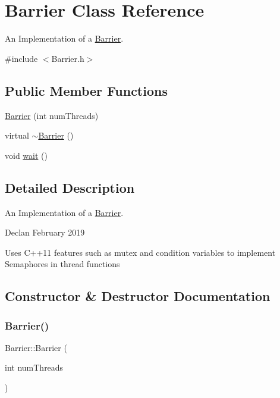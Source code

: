 \hypertarget{class_barrier}{}\section{Barrier Class Reference}
\label{class_barrier}


An Implementation of a \hyperlink{class_barrier}{Barrier}.  




{\ttfamily \#include $<$Barrier.\+h$>$}

\subsection*{Public Member Functions}
\begin{DoxyCompactItemize}
\item 
\hyperlink{class_barrier_a7290fb8952d0f7779b8d6a7a34bbd407}{Barrier} (int num\+Threads)
\item 
virtual \hyperlink{class_barrier_a401f40e73302009b305904ffc7825304}{$\sim$\+Barrier} ()
\item 
void \hyperlink{class_barrier_a83a9d2e85e98b3d2081538bf0da29b60}{wait} ()
\end{DoxyCompactItemize}


\subsection{Detailed Description}
An Implementation of a \hyperlink{class_barrier}{Barrier}. 

Declan February 2019

Uses C++11 features such as mutex and condition variables to implement Semaphores in thread functions 

\subsection{Constructor \& Destructor Documentation}
\mbox{\label{class_barrier_a7290fb8952d0f7779b8d6a7a34bbd407}} 
\subsubsection{\texorpdfstring{Barrier()}{Barrier()}}
{\footnotesize\ttfamily Barrier\+::\+Barrier (\begin{DoxyParamCaption}\item[{int}]{num\+Threads }\end{DoxyParamCaption})}

